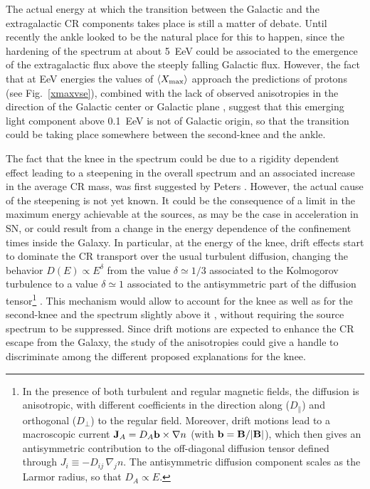 \documentclass[twoside,12pt]{article}
\begin{document}
The actual energy at which the transition between the Galactic and the extragalactic CR components takes place is still a matter of debate. Until recently the ankle looked to be the natural place for this to happen, since the hardening of the spectrum at about 5~EeV could be associated to the emergence of the extragalactic flux above the steeply falling Galactic flux. However, the fact that at EeV energies the values of $\langle X_{\rm max}\rangle$ approach the predictions of protons (see Fig.~\ref{xmaxvse}), combined with the lack of observed anisotropies in the direction of the Galactic center or Galactic plane \cite{LS12}, suggest that this emerging light component above 0.1~EeV is not of Galactic origin, so that the transition could be taking place somewhere between the second-knee and the ankle.

The fact that the knee in the spectrum could be due to a rigidity dependent effect leading to a steepening in the overall spectrum and an associated increase in the average CR mass, was first suggested by Peters \cite{pe61}. However, the actual cause of the steepening is not yet known. It could be the consequence of a limit in the maximum energy achievable at the sources, as may be the case in acceleration in SN, or could result from a change in the energy dependence of the confinement times inside the Galaxy. In particular, at the energy of the knee, drift effects start to dominate the CR transport over the usual turbulent diffusion, changing the behavior $D(E)\propto E^\delta$ from the value $\delta\simeq 1/3$ associated to the Kolmogorov turbulence to a value $\delta\simeq 1$ associated to the antisymmetric part of the diffusion tensor\footnote{In the presence of both turbulent and regular magnetic fields, the diffusion is anisotropic, with different coefficients in the direction along ($D_\parallel$) and orthogonal ($D_\perp$) to the regular field. Moreover, drift motions lead to a macroscopic current ${\bf J}_A=D_A {\bf b}\times  \nabla n$ (with ${\bf b}={\bf B}/|{\bf B}|$), which then gives an antisymmetric contribution to the off-diagonal diffusion tensor defined through $ J_i\equiv - D_{ij}\,  \nabla_j n$. The antisymmetric diffusion component scales as the Larmor radius, so that $D_A\propto E$.} \cite{ptanti}. This mechanism would allow to account for the knee as well as for the second-knee and the spectrum slightly above it \cite{caknee,caanti}, without requiring the source spectrum to be suppressed. Since drift motions are expected to enhance the CR escape from the Galaxy, the study of the anisotropies could give a handle to discriminate among the different proposed explanations for the knee.
\end{document}
